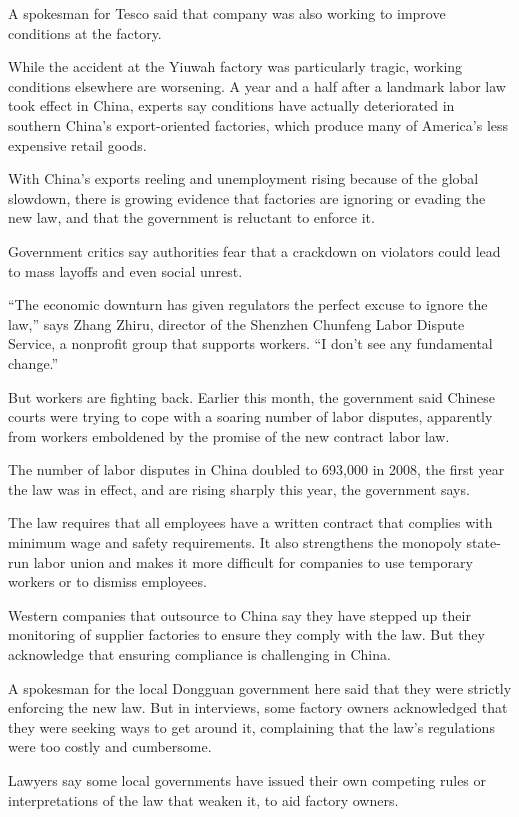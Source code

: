 ﻿\documentclass[12pt,a4paper,onecolumn]{article}
\begin{document}
A spokesman for Tesco said that company was also working to improve conditions at the factory.

While the accident at the Yiuwah factory was particularly tragic, working conditions elsewhere are
worsening. A year and a half after a landmark labor law took effect in China, experts say conditions
have actually deteriorated in southern China's export-oriented factories, which produce many of
America's less expensive retail goods.

With China's exports reeling and unemployment rising because of the global slowdown, there is
growing evidence that factories are ignoring or evading the new law, and that the government is
reluctant to enforce it.

Government critics say authorities fear that a crackdown on violators could lead to mass layoffs and
even social unrest.

``The economic downturn has given regulators the perfect excuse to ignore the law,'' says Zhang
Zhiru, director of the Shenzhen Chunfeng Labor Dispute Service, a nonprofit group that supports
workers. ``I don't see any fundamental change.''

But workers are fighting back. Earlier this month, the government said Chinese courts were trying to
cope with a soaring number of labor disputes, apparently from workers emboldened by the promise of
the new contract labor law.

The number of labor disputes in China doubled to 693,000 in 2008, the first year the law was in
effect, and are rising sharply this year, the government says.

The law requires that all employees have a written contract that complies with minimum wage and
safety requirements. It also strengthens the monopoly state-run labor union and makes it more
difficult for companies to use temporary workers or to dismiss employees.

Western companies that outsource to China say they have stepped up their monitoring of supplier
factories to ensure they comply with the law. But they acknowledge that ensuring compliance is
challenging in China.

A spokesman for the local Dongguan government here said that they were strictly enforcing the new
law. But in interviews, some factory owners acknowledged that they were seeking ways to get around
it, complaining that the law's regulations were too costly and cumbersome.

Lawyers say some local governments have issued their own competing rules or interpretations of the
law that weaken it, to aid factory owners.
\end{document}
